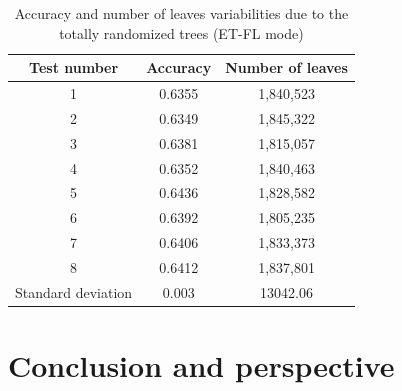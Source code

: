 \documentclass[a4paper]{report}
\begin{document}
	\begin{table}
		\centering
			\begin{tabular}{c|c|c}
			\hline
			Test number & Accuracy & Number of leaves\\
			\hline \hline
			1  & 0.6355 & 1,840,523\\
			2 & 0.6349 & 1,845,322 \\
			3 & 0.6381 & 1,815,057 \\
			4 & 0.6352 & 1,840,463 \\
			5 & 0.6436 & 1,828,582 \\
			6 & 0.6392 & 1,805,235 \\
			7 & 0.6406 & 1,833,373\\
			8 & 0.6412 & 1,837,801\\
			\hline
			\hline
			Standard deviation & 0.003 & 13042.06\\
			\hline
			\end{tabular}
		\caption{\label{tab:BagVarTreesOnly}Accuracy and number of leaves variabilities due to the totally randomized trees (ET-FL mode)}
	\end{table}
	
	
\chapter{Conclusion and perspective}

 


  
\end{document}
